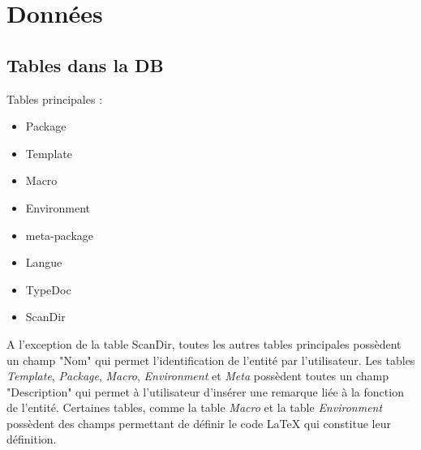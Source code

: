 \documentclass[a4paper, oneside]{article}
\begin{document}
\section{Données}
\label{sec:orgbd0f86f}
\subsection{Tables dans la DB}
\label{sec:org7458969}
Tables principales :
\begin{itemize}
\item Package
\item Template
\item Macro
\item Environment
\item meta-package
\item Langue
\item TypeDoc
\item ScanDir
\end{itemize}

A l'exception de la table ScanDir, toutes les autres tables
principales possèdent un champ "Nom" qui permet l'identification de
l'entité par l'utilisateur. Les tables \emph{Template}, \emph{Package}, \emph{Macro},
\emph{Environment} et \emph{Meta} possèdent toutes un champ "Description" qui
permet à l'utilisateur d'insérer une remarque liée à la fonction de
l'entité. Certaines tables, comme la table \emph{Macro} et la table
\emph{Environment} possèdent des champs permettant de définir le code
\LaTeX{} qui constitue leur définition.
\end{document}
